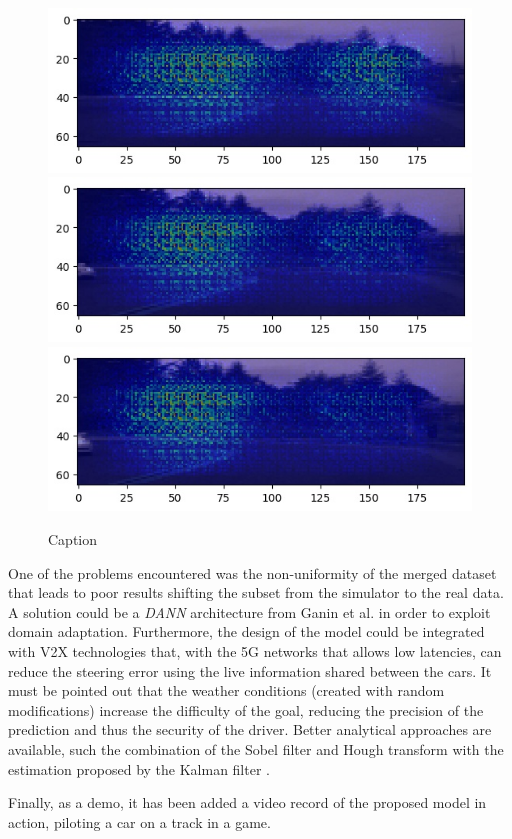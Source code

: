 \documentclass[10pt,twocolumn,letterpaper]{article}
\begin{document}
\begin{figure}[h!]
    \includegraphics[scale=0.33]{3rd-real/yes10-1475522434613719763.jpg} \\
    \includegraphics[scale=0.33]{3rd-real/yes10-1475522435113681487.jpg} \\
    \includegraphics[scale=0.33]{3rd-real/yes10-1475522435613512147.jpg} \\
    \caption{Caption}
    \label{fig:track3}
\end{figure}

One of the problems encountered was the non-uniformity of the merged dataset that leads to poor results shifting the subset from the simulator to the real data. A solution could be a \textit{DANN} architecture from Ganin et al. \cite{Alpher06} in order to exploit domain adaptation. Furthermore, the design of the model could be integrated with V2X technologies that, with the 5G networks that allows low latencies, can reduce the steering error using the live information shared between the cars. It must be pointed out that the weather conditions (created with random modifications) increase the difficulty of the goal, reducing the precision of the prediction and thus the security of the driver. Better analytical approaches are available, such the combination of the Sobel filter \cite{Alpher08} and Hough transform \cite{Alpher09} with the estimation proposed by the Kalman filter \cite{Alpher07}.


Finally, as a demo, it has been added a video record of the proposed model in action, piloting a car on a track in a game.

{\small


}
\end{document}
